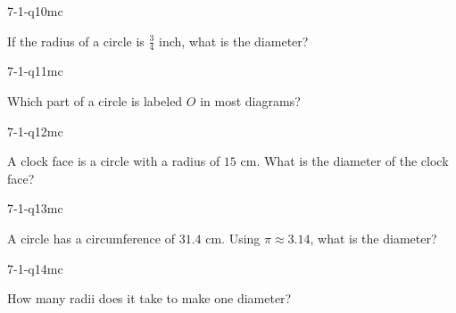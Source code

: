 \begin{practiceQuestion}{7-1-q10}{mc}
\begin{questionText}
If the radius of a circle is $\frac{3}{4}$ inch, what is the diameter?
\end{questionText}
\end{practiceQuestion}

\begin{practiceQuestion}{7-1-q11}{mc}
\begin{questionText}
Which part of a circle is labeled $O$ in most diagrams?
\end{questionText}
\end{practiceQuestion}

\begin{practiceQuestion}{7-1-q12}{mc}
\begin{questionText}
A clock face is a circle with a radius of $15$ cm. What is the diameter of the clock face?
\end{questionText}
\end{practiceQuestion}

\begin{practiceQuestion}{7-1-q13}{mc}
\begin{questionText}
A circle has a circumference of $31.4$ cm. Using $\pi \approx 3.14$, what is the diameter?
\end{questionText}
\end{practiceQuestion}

\begin{practiceQuestion}{7-1-q14}{mc}
\begin{questionText}
How many radii does it take to make one diameter?
\end{questionText}
\end{practiceQuestion}

